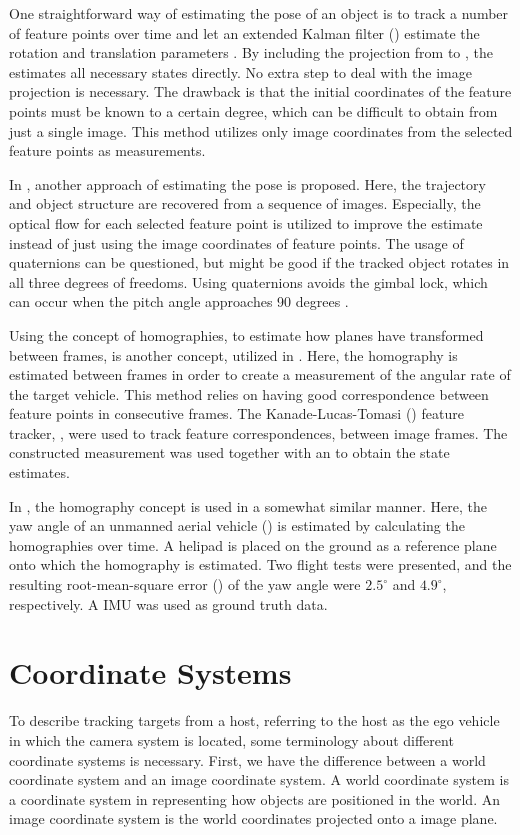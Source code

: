 One straightforward way of estimating the  pose of an object is to track a number of feature points over time and let an extended Kalman filter (\abbrEKF) estimate the rotation and translation parameters \cite{Hajimolahoseini:2014}.
By including the projection from  to , the \abbrEKF estimates all necessary states directly.
No extra step to deal with the image projection is necessary.
The drawback is that the initial  coordinates of the feature points must be known to a certain degree, which can be difficult to obtain from just a single image.
This method utilizes only image coordinates from the selected feature points as measurements.

In \cite{Blostein:2000}, another approach of estimating the  pose is proposed.
Here, the  trajectory and object structure are recovered from a sequence of images.
Especially, the optical flow for each selected feature point is utilized to improve the estimate instead of just using the image coordinates of feature points.
The usage of quaternions can be questioned, but might be good if the tracked object rotates in all three degrees of freedoms.
Using quaternions avoids the gimbal lock, which can occur when the pitch angle approaches 90 degrees \cite{Gustafsson:2012}.

Using the concept of homographies, \ie to estimate how planes have transformed between frames, is another concept, utilized in \cite{Gabb:2013}.
Here, the homography is estimated between frames in order to create a measurement of the angular rate of the target vehicle.
This method relies on having good correspondence between feature points in consecutive frames.
The Kanade-Lucas-Tomasi (\abbrKLT) feature tracker, \eg \cite{Szeliski:2011}, were used to track feature correspondences, between image frames.
The constructed measurement was used together with an \abbrEKF to obtain the state estimates.

In \cite{Mondragon:2010}, the homography concept is used in a somewhat similar manner.
Here, the yaw angle of an unmanned aerial vehicle (\abbrUAV) is estimated by calculating the homographies over time.
A helipad is placed on the ground as a reference plane onto which the homography is estimated.
Two flight tests were presented, and the resulting root-mean-square error (\abbrRMSE) of the yaw angle were $2.5^\circ$ and $4.9^\circ$, respectively.
A IMU was used as ground truth data.

\section{Coordinate Systems}
To describe tracking targets from a host, referring to the host as the ego vehicle in which the camera system is located, some terminology about different coordinate systems is necessary.
First, we have the difference between a world coordinate system  and an image coordinate system.
A world coordinate system is a coordinate system in  representing how objects are positioned in the world.
An image coordinate system is the  world coordinates projected onto a  image plane.

